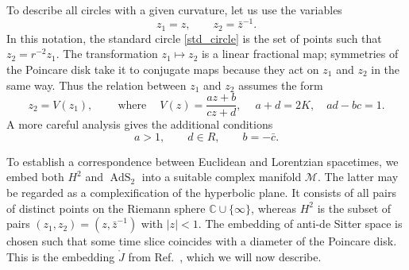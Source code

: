 \documentclass[12pt]{article}
\newcommand{\calM}{\mathcal{M}}
\newcommand{\RR}{\mathbb{R}}
\newcommand{\CC}{\mathbb{C}}
\DeclareMathOperator{\tAdS}{\widetilde{AdS}}
\DeclareMathOperator{\HH}{H}
\def\widetilde#1{#1}%
\def\HH{H}
\def\RR{R}
\begin{document}
To describe all circles with a given curvature, let us use the variables
\begin{equation}\label{z1z2}
z_1=z,\qquad z_2=\bar{z}^{-1}.
\end{equation}
In this notation, the standard circle \eqref{std_circle} is the set of points such that $z_2=r^{-2}z_1$. The transformation $z_1\mapsto z_2$ is a linear fractional map; symmetries of the Poincare disk take it to conjugate maps because they act on $z_1$ and $z_2$ in the same way. Thus the relation between $z_1$ and $z_2$ assumes the form
\begin{equation}\label{z2Vz1}
z_2=V(z_1),\qquad\: \text{where}\quad\:V(z)=\frac{az+b}{cz+d},\quad\:
a+d=2K,\quad ad-bc=1.
\end{equation}
A more careful analysis gives the additional conditions
\begin{equation}\label{abcd_cond1}
a>1,\qquad d\in\RR,\qquad b=-\bar{c}.
\end{equation}

To establish a correspondence between Euclidean and Lorentzian spacetimes, we embed both $\HH^2$ and $\tAdS_2$ into a suitable complex manifold $\calM$. The latter may be regarded as a complexification of the hyperbolic plane. It consists of all pairs of distinct points on the Riemann sphere $\CC\cup\{\infty\}$, whereas $\HH^2$ is the subset of pairs $(z_1,z_2)=(z,\bar{z}^{-1})$ with $|z|<1$. The embedding of anti-de Sitter space is chosen such that some time slice coincides with a diameter of the Poincare disk. This is the embedding $\mathring{J}$ from Ref.~\cite{SL2R}, which we will now describe.
\end{document}
